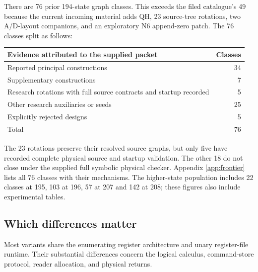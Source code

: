 There are 76 prior 194-state graph classes. This exceeds the filed
catalogue's 49 because the current incoming material adds QH, 23 source-tree
rotations, two A/D-layout companions, and an exploratory N6 append-zero
patch. The 76 classes split as follows:
\begin{center}
\begin{tabular}{@{}lr@{}}\toprule
Evidence attributed to the supplied packet & Classes\\\midrule
Reported principal constructions &34\\
Supplementary constructions &7\\
Research rotations with full source contracts and startup recorded &5\\
Other research auxiliaries or seeds &25\\
Explicitly rejected designs &5\\\midrule
Total &76\\\bottomrule
\end{tabular}
\end{center}
The 23 rotations preserve their resolved source graphs, but only five
have recorded complete physical source and startup validation. The other
18 do not close under the supplied full symbolic physical checker.
Appendix \ref{app:frontier} lists all 76 classes with their mechanisms.
The higher-state population includes 22 classes at 195, 103 at 196,
57 at 207 and 142 at 208; these figures also include experimental tables.

\subsection{Which differences matter}

Most variants share the enumerating register architecture and unary
register-file runtime. Their substantial differences concern the logical
calculus, command-store protocol, reader allocation, and physical returns.

